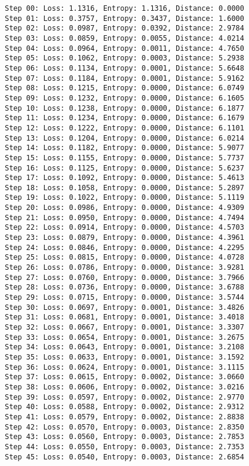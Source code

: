 \documentclass[11pt]{article}
\begin{document}
\begin{Verbatim}[commandchars=\\\{\}]
Step 00: Loss: 1.1316, Entropy: 1.1316, Distance: 0.0000
Step 01: Loss: 0.3757, Entropy: 0.3437, Distance: 1.6000
Step 02: Loss: 0.0987, Entropy: 0.0392, Distance: 2.9784
Step 03: Loss: 0.0859, Entropy: 0.0055, Distance: 4.0214
Step 04: Loss: 0.0964, Entropy: 0.0011, Distance: 4.7650
Step 05: Loss: 0.1062, Entropy: 0.0003, Distance: 5.2938
Step 06: Loss: 0.1134, Entropy: 0.0001, Distance: 5.6648
Step 07: Loss: 0.1184, Entropy: 0.0001, Distance: 5.9162
Step 08: Loss: 0.1215, Entropy: 0.0000, Distance: 6.0749
Step 09: Loss: 0.1232, Entropy: 0.0000, Distance: 6.1605
Step 10: Loss: 0.1238, Entropy: 0.0000, Distance: 6.1877
Step 11: Loss: 0.1234, Entropy: 0.0000, Distance: 6.1679
Step 12: Loss: 0.1222, Entropy: 0.0000, Distance: 6.1101
Step 13: Loss: 0.1204, Entropy: 0.0000, Distance: 6.0214
Step 14: Loss: 0.1182, Entropy: 0.0000, Distance: 5.9077
Step 15: Loss: 0.1155, Entropy: 0.0000, Distance: 5.7737
Step 16: Loss: 0.1125, Entropy: 0.0000, Distance: 5.6237
Step 17: Loss: 0.1092, Entropy: 0.0000, Distance: 5.4613
Step 18: Loss: 0.1058, Entropy: 0.0000, Distance: 5.2897
Step 19: Loss: 0.1022, Entropy: 0.0000, Distance: 5.1119
Step 20: Loss: 0.0986, Entropy: 0.0000, Distance: 4.9309
Step 21: Loss: 0.0950, Entropy: 0.0000, Distance: 4.7494
Step 22: Loss: 0.0914, Entropy: 0.0000, Distance: 4.5703
Step 23: Loss: 0.0879, Entropy: 0.0000, Distance: 4.3961
Step 24: Loss: 0.0846, Entropy: 0.0000, Distance: 4.2295
Step 25: Loss: 0.0815, Entropy: 0.0000, Distance: 4.0728
Step 26: Loss: 0.0786, Entropy: 0.0000, Distance: 3.9281
Step 27: Loss: 0.0760, Entropy: 0.0000, Distance: 3.7966
Step 28: Loss: 0.0736, Entropy: 0.0000, Distance: 3.6788
Step 29: Loss: 0.0715, Entropy: 0.0000, Distance: 3.5744
Step 30: Loss: 0.0697, Entropy: 0.0001, Distance: 3.4826
Step 31: Loss: 0.0681, Entropy: 0.0001, Distance: 3.4018
Step 32: Loss: 0.0667, Entropy: 0.0001, Distance: 3.3307
Step 33: Loss: 0.0654, Entropy: 0.0001, Distance: 3.2675
Step 34: Loss: 0.0643, Entropy: 0.0001, Distance: 3.2108
Step 35: Loss: 0.0633, Entropy: 0.0001, Distance: 3.1592
Step 36: Loss: 0.0624, Entropy: 0.0001, Distance: 3.1115
Step 37: Loss: 0.0615, Entropy: 0.0002, Distance: 3.0660
Step 38: Loss: 0.0606, Entropy: 0.0002, Distance: 3.0216
Step 39: Loss: 0.0597, Entropy: 0.0002, Distance: 2.9770
Step 40: Loss: 0.0588, Entropy: 0.0002, Distance: 2.9312
Step 41: Loss: 0.0579, Entropy: 0.0002, Distance: 2.8838
Step 42: Loss: 0.0570, Entropy: 0.0003, Distance: 2.8350
Step 43: Loss: 0.0560, Entropy: 0.0003, Distance: 2.7853
Step 44: Loss: 0.0550, Entropy: 0.0003, Distance: 2.7353
Step 45: Loss: 0.0540, Entropy: 0.0003, Distance: 2.6854

\end{Verbatim}
\end{document}
